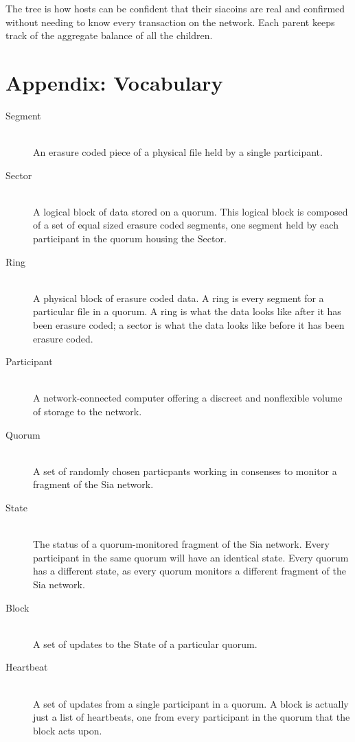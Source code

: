 \documentclass[twocolumn]{article}
\begin{document}
The tree is how hosts can be confident that their siacoins are real and confirmed without needing to know every transaction on the network.
Each parent keeps track of the aggregate balance of all the children.

\section{Appendix: Vocabulary}

\begin{description}
	\item[Segment] \hfill \\
	An erasure coded piece of a physical file held by a single participant.
	\item[Sector] \hfill \\
	A logical block of data stored on a quorum.
	This logical block is composed of a set of equal sized erasure coded segments, one segment held by each participant in the quorum housing the Sector.
	\item[Ring] \hfill \\
	A physical block of erasure coded data.
	A ring is every segment for a particular file in a quorum.
	A ring is what the data looks like after it has been erasure coded; a sector is what the data looks like before it has been erasure coded.
	
	\item[Participant] \hfill \\
	A network-connected computer offering a discreet and nonflexible volume of storage to the network.
	\item[Quorum] \hfill \\
	A set of randomly chosen particpants working in consenses to monitor a fragment of the Sia network.
	\item[State] \hfill \\
	The status of a quorum-monitored fragment of the Sia network.
	Every participant in the same quorum will have an identical state.
	Every quorum has a different state, as every quorum monitors a different fragment of the Sia network.

	\item[Block] \hfill \\
	A set of updates to the State of a particular quorum.
	\item[Heartbeat] \hfill \\
	A set of updates from a single participant in a quorum.
	A block is actually just a list of heartbeats, one from every participant in the quorum that the block acts upon.
\end{description}
\end{document}
